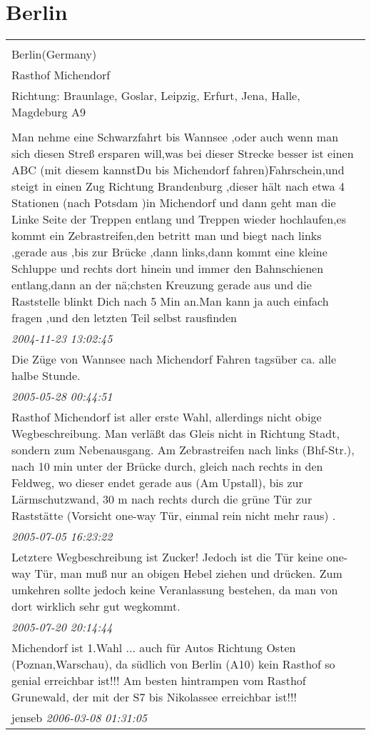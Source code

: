 \documentclass[a4paper,12pt]{article}
\begin{document}
\section{Berlin}
\begin{tabular}{|p{13cm}|}
\hline\\
Berlin(Germany)\\
Rasthof Michendorf\\
Richtung: Braunlage, Goslar, Leipzig, Erfurt, Jena, Halle, Magdeburg A9 \\
\hline\\
Man nehme eine Schwarzfahrt bis Wannsee ,oder auch wenn man sich diesen Streß ersparen will,was bei dieser Strecke besser ist einen ABC (mit diesem kannstDu bis Michendorf fahren)Fahrschein,und steigt in einen Zug Richtung Brandenburg ,dieser hält nach etwa 4 Stationen (nach Potsdam )in Michendorf und dann geht man die Linke Seite der Treppen entlang und Treppen wieder hochlaufen,es kommt ein Zebrastreifen,den betritt man und biegt nach links ,gerade aus ,bis zur Brücke ,dann links,dann kommt eine kleine Schluppe und rechts dort hinein und immer den Bahnschienen entlang,dann an der nä;chsten Kreuzung gerade aus und die Raststelle blinkt Dich nach 5 Min an.Man kann ja auch einfach fragen ,und den letzten Teil selbst rausfinden \\
\textit{ 2004-11-23 13:02:45 }\\\hline Die Züge von Wannsee nach Michendorf Fahren tagsüber ca. alle halbe Stunde. \\
\textit{ 2005-05-28 00:44:51 }\\\hline Rasthof Michendorf ist aller erste Wahl, allerdings nicht obige Wegbeschreibung. Man verläßt das Gleis nicht in Richtung Stadt, sondern zum Nebenausgang. Am Zebrastreifen nach links (Bhf-Str.), nach 10 min unter der Brücke durch, gleich nach rechts in den Feldweg, wo dieser endet gerade aus (Am Upstall), bis zur Lärmschutzwand, 30 m nach rechts durch die grüne Tür zur Raststätte (Vorsicht one-way Tür, einmal rein nicht mehr raus) . \\
\textit{ 2005-07-05 16:23:22 }\\\hline Letztere Wegbeschreibung ist Zucker! Jedoch ist die Tür keine one- way Tür, man muß nur an obigen Hebel ziehen und drücken. Zum umkehren sollte jedoch keine Veranlassung bestehen, da man von dort wirklich sehr gut wegkommt. \\
\textit{ 2005-07-20 20:14:44 }\\\hline Michendorf ist 1.Wahl ... auch für Autos Richtung Osten (Poznan,Warschau), da südlich von Berlin (A10) kein Rasthof so genial erreichbar ist!!!
Am besten hintrampen vom Rasthof Grunewald, der mit der S7 bis Nikolassee erreichbar ist!!! \\
jenseb \textit{ 2006-03-08 01:31:05 }\\\hline
\end{tabular}
\end{document}
